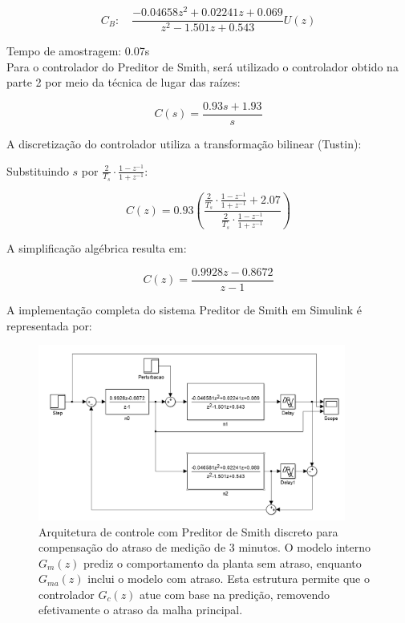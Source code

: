 \documentclass[a4paper,12pt]{article}
\begin{document}
\begin{equation}
C_B: \quad \frac{-0.04658 z^2 + 0.02241 z + 0.069}{z^2 - 1.501 z + 0.543}U(z)
\end{equation}

Tempo de amostragem: 0.07s \\

Para o controlador do Preditor de Smith, será utilizado o controlador obtido na parte 2 por meio da técnica de lugar das raízes:

\begin{equation}
C(s) = \frac{0.93 s + 1.93}{s}
\label{eq:controlador_continuo}
\end{equation}

A discretização do controlador utiliza a transformação bilinear (Tustin):

Substituindo $s$ por $\frac{2}{T_s} \cdot \frac{1 - z^{-1}}{1 + z^{-1}}$:

\[
C(z) = 0.93\left(\frac{\frac{2}{T_s} \cdot \frac{1 - z^{-1}}{1 + z^{-1}} + 2.07}{\frac{2}{T_s} \cdot \frac{1 - z^{-1}}{1 + z^{-1}}}\right)
\]

A simplificação algébrica resulta em:

\begin{equation}
C(z) = \frac{0.9928z - 0.8672}{z-1}
\label{eq:controlador_discreto}
\end{equation}

A implementação completa do sistema Preditor de Smith em Simulink é representada por:

 \begin{figure}[H]
  \centering
  \includegraphics[width=0.9\textwidth]{Imagens/q1.png}
  \caption{Arquitetura de controle com Preditor de Smith discreto para compensação do atraso de medição de 3 minutos. O modelo interno $G_m(z)$ prediz o comportamento da planta sem atraso, enquanto $G_{ma}(z)$ inclui o modelo com atraso. Esta estrutura permite que o controlador $G_c(z)$ atue com base na predição, removendo efetivamente o atraso da malha principal.}
  \end{figure}
\end{document}
